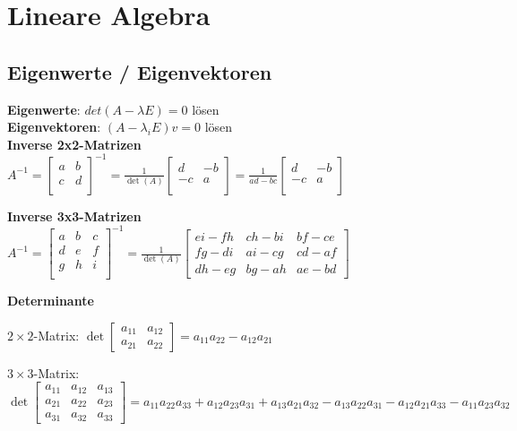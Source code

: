 \newpage
\section{Lineare Algebra}
\subsection{Eigenwerte / Eigenvektoren}
\textbf{Eigenwerte}: $det(A-\lambda E) = 0$ lösen\\

\textbf{Eigenvektoren}: $(A-\lambda_i E)v = 0$ lösen\\

\textbf{Inverse 2x2-Matrizen}\\
$A^{-1} = \begin{bmatrix}
a & b \\ c & d \\
\end{bmatrix}^{-1} =
\frac{1}{\det(A)} \begin{bmatrix}
d & -b \\ -c & a \\
\end{bmatrix}  =
\frac{1}{ad-bc} \begin{bmatrix}
d & -b \\ -c & a \\
\end{bmatrix}$

\textbf{Inverse 3x3-Matrizen}\\
$A^{-1} = \begin{bmatrix}
a & b & c\\ d & e & f \\ g & h & i \\
\end{bmatrix}^{-1} =
\frac{1}{\det(A)} \begin{bmatrix}
ei - fh & ch - bi & bf - ce \\
fg - di & ai - cg & cd - af \\
dh - eg & bg - ah & ae - bd
\end{bmatrix}$

\textbf{Determinante}

$2 \times 2$-Matrix:
$\det
 \begin{bmatrix}
 a_{11} & a_{12} \\
 a_{21} & a_{22}
 \end{bmatrix}
= a_{11} a_{22} - a_{12} a_{21}$

$3 \times 3$-Matrix:
$\det
 \begin{bmatrix}
 a_{11} & a_{12} & a_{13} \\
 a_{21} & a_{22} & a_{23} \\
 a_{31} & a_{32} & a_{33}
 \end{bmatrix} = a_{11} a_{22} a_{33} +a_{12} a_{23} a_{31} + a_{13} a_{21} a_{32} - a_{13} a_{22} a_{31} - a_{12} a_{21} a_{33} - a_{11} a_{23} a_{32}$


